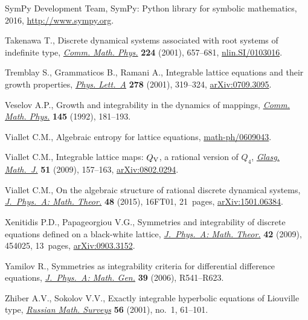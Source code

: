\documentclass[pdftex]{sigma}
\numberwithin{equation}{section}
\begin{document}
\begin{thebibliography}{99}
SymPy Development Team, SymPy: Python library for symbolic mathematics, 2016,
 \url{http://www.sympy.org}.

Takenawa T., Discrete dynamical systems associated with root systems of
 indef\/inite type, \href{https://doi.org/10.1007/s002200100568}{\textit{Comm. Math. Phys.}} \textbf{224} (2001), 657--681,
 \href{https://arxiv.org/abs/nlin.SI/0103016}{nlin.SI/0103016}.

Tremblay S., Grammaticos B., Ramani A., Integrable lattice equations and their
 growth properties, \href{https://doi.org/10.1016/S0375-9601(00)00806-9}{\textit{Phys. Lett.~A}} \textbf{278} (2001), 319--324,
 \href{https://arxiv.org/abs/0709.3095}{arXiv:0709.3095}.

Veselov A.P., Growth and integrability in the dynamics of mappings,
 \href{https://doi.org/10.1007/BF02099285}{\textit{Comm. Math. Phys.}} \textbf{145} (1992), 181--193.

Viallet C.M., Algebraic entropy for lattice equations,
 \href{https://arxiv.org/abs/math-ph/0609043}{math-ph/0609043}.

Viallet C.M., Integrable lattice maps: {$Q_{\rm V}$}, a rational version of {$Q_4$},
 \href{https://doi.org/10.1017/S0017089508004874}{\textit{Glasg. Math.~J.}} \textbf{51} (2009), 157--163, \href{https://arxiv.org/abs/0802.0294}{arXiv:0802.0294}.

Viallet C.M., On the algebraic structure of rational discrete dynamical
 systems, \href{https://doi.org/10.1088/1751-8113/48/16/16FT01}{\textit{J.~Phys.~A: Math. Theor.}} \textbf{48} (2015), 16FT01,
 21~pages, \href{https://arxiv.org/abs/1501.06384}{arXiv:1501.06384}.

Xenitidis P.D., Papageorgiou V.G., Symmetries and integrability of discrete
 equations def\/ined on a black-white lattice, \href{https://doi.org/10.1088/1751-8113/42/45/454025}{\textit{J.~Phys.~A: Math. Theor.}}
 \textbf{42} (2009), 454025, 13~pages, \href{https://arxiv.org/abs/0903.3152}{arXiv:0903.3152}.

Yamilov R., Symmetries as integrability criteria for dif\/ferential dif\/ference
 equations, \href{https://doi.org/10.1088/0305-4470/39/45/R01}{\textit{J.~Phys.~A: Math. Gen.}} \textbf{39} (2006), R541--R623.

Zhiber A.V., Sokolov V.V., Exactly integrable hyperbolic equations of
 {L}iouville type, \href{https://doi.org/10.1070/rm2001v056n01ABEH000357}{\textit{Russian Math. Surveys}} \textbf{56} (2001), no.~1,
 61--101.

\end{thebibliography}\LastPageEnding
\end{document}
